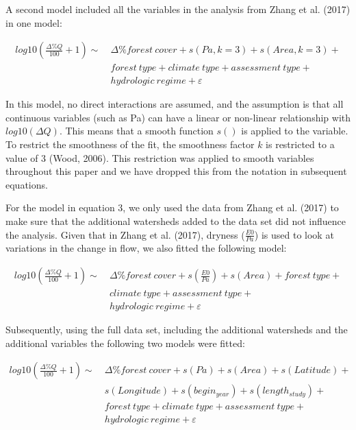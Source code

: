 \documentclass[]{elsarticle} %
\begin{document}
A second model included all the variables in the analysis from Zhang et
al. (2017) in one model:

\[\tag{3}
\begin{aligned}
log10(\frac{\Delta \% Q}{100} + 1) \sim ~ &\Delta \% forest~cover + s(Pa, k = 3) + s(Area, k = 3) +  \\
& {forest~type} + {climate~type} + {assessment~type} + \\  
& {hydrologic~regime} + \varepsilon
\end{aligned}\]

In this model, no direct interactions are assumed, and the assumption is
that all continuous variables (such as Pa) can have a linear or
non-linear relationship with \(log10(\Delta Q)\). This means that a
smooth function \(s()\) is applied to the variable. To restrict the
smoothness of the fit, the smoothness factor \(k\) is restricted to a
value of 3 (Wood, 2006). This restriction was applied to smooth
variables throughout this paper and we have dropped this from the
notation in subsequent equations.

For the model in equation 3, we only used the data from Zhang et al.
(2017) to make sure that the additional watersheds added to the data set
did not influence the analysis. Given that in Zhang et al. (2017),
dryness (\(\frac{E0}{Pa}\)) is used to look at variations in the change
in flow, we also fitted the following model:

\[\tag{4}
\begin{aligned}
log10(\frac{\Delta \% Q}{100} + 1) \sim ~&\Delta \% forest~cover + s(\frac{E0}{Pa}) + s(Area) +  {forest~type} + 
\\  &{climate~type} + {assessment~type} + \\  &{hydrologic~regime} + \varepsilon
\end{aligned}\]

Subsequently, using the full data set, including the additional
watersheds and the additional variables the following two models were
fitted:

\[\tag{5}
\begin{aligned}
log10(\frac{\Delta \% Q}{100} + 1) \sim ~&\Delta \% forest~cover + s(Pa) + s(Area) + s(Latitude) + \\
& s(Longitude) + s(begin_{year}) + s(length_{study}) +\\
&{forest~type} + {climate~type} + {assessment~type} +\\
& {hydrologic~regime} + \varepsilon
\end{aligned}\]
\end{document}
